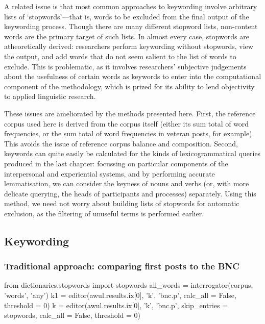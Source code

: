 A related issue is that most common approaches to keywording involve arbitrary lists of `stopwords'---that is, words to be excluded from the final output of the keywording process. Though there are many different stopword lists, non-content words are the primary target of such lists. In almost every case, stopwords are atheoretically derived: researchers perform keywording without stopwords, view the output, and add words that do not seem salient to the list of words to exclude. This is problematic, as it involves researchers' subjective judgements about the usefulness of certain words as keywords to enter into the computational component of the methodology, which is prized for its ability to lend objectivity to applied linguistic research.

These issues are ameliorated by the methods presented here. First, the reference corpus used here is derived from the corpus itself (either its sum total of word frequencies, or the sum total of word frequencies in veteran posts, for example). This avoids the issue of reference corpus balance and composition. Second, keywords can quite easily be calculated for the kinds of lexicogrammatical queries produced in the last chapter: focussing on particular components of the interpersonal and experiential systems, and by performing accurate lemmatisation, we can consider the keyness of nouns and verbs (or, with more delicate querying, the heads of participants and processes) separately. Using this method, we need not worry about building lists of stopwords for automatic exclusion, as the filtering of unuseful terms is performed earlier.

\subsection{Keywording}

\subsubsection{Traditional approach: comparing first posts to the BNC}

\begin{pyverbatim}
from dictionaries.stopwords import stopwords
all_words = interrogator(corpus, 'words', 'any')
k1 = editor(awul.results.ix[0], 'k', 'bnc.p', calc_all = False, threshold = 0)
k = editor(awul.results.ix[0], 'k', 'bnc.p', skip_entries = stopwords, 
           calc_all = False, threshold = 0)
\end{pyverbatim}

